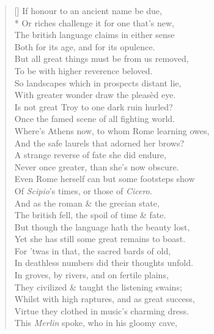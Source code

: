\documentclass[MAIN]{subfiles}
\begin{document}
\settowidth{\versewidth}{If honour to an ancient name be due,}
\begin{verse}[\versewidth]
If honour to an ancient name be due,\\*
Or riches challenge it for one that's new,\\
The british language claims in either sense\\
Both for its age, and for its opulence.\\
But all great things must be from us removed,\\
To be with higher reverence beloved.\\
So landscapes which in prospects distant lie,\\
With greater wonder draw the pleas\`ed eye.\\
Is not great {\sc Troy} to one dark ruin hurled?\\ 
Once the famed scene of all fighting world.\\ 
Where's {\sc Athens} now, to whom {\sc Rome} learning owes,\\
And the safe laurels that adorned her brows?\\
A strange reverse of fate she did endure,\\
Never once greater, than she's now obscure.\\
Even {\sc Rome} herself can but some footsteps show\\
Of \emph{Scipio}'s times, or those of \emph{Cicero}.\\
And as the roman \& the grecian state,\\
The british fell, the spoil of time \& fate.\\
But though the language hath the beauty lost,\\
Yet she has still some great remains to boast.\\
For 'twas in that, the sacred bards of old,\\
In deathless numbers did their thoughts unfold.\\
In groves, by rivers, and on fertile plains,\\
They civilized \& taught the listening swains;\\
Whilst with high raptures, and as great success,\\
Virtue they clothed in music's charming dress.\\
This \emph{Merlin} spoke, who in his gloomy cave,\\

\end{verse}
\end{document}
